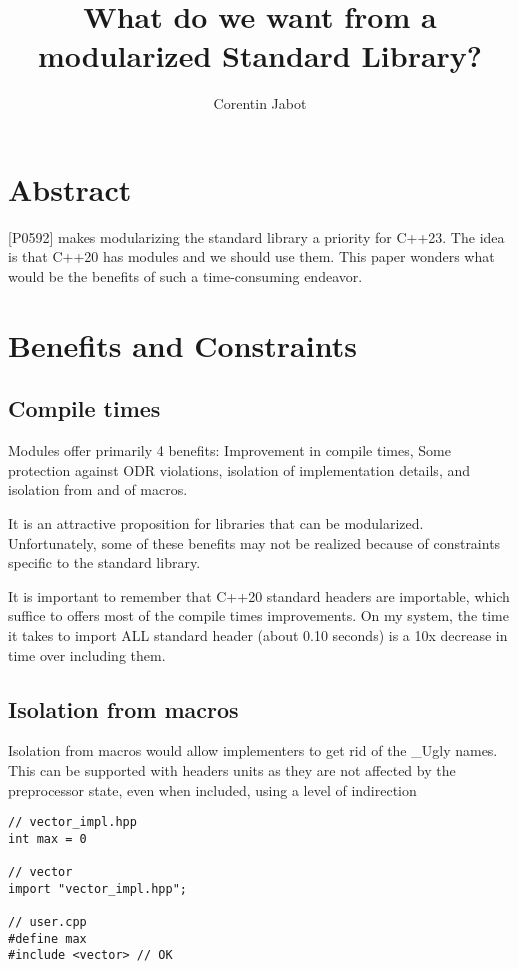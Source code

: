 \documentclass{wg21}
\title{What do we want from a modularized Standard Library?}
\author{Corentin Jabot}{corentin.jabot@gmail.com}
\begin{document}
\maketitle




\section{Abstract}

[P0592]\cite{P0592R4} makes modularizing the standard library a priority for C++23.
The idea is that C++20 has modules and we should use them.
This paper wonders what would be the benefits of such a time-consuming endeavor.

\section{Benefits and Constraints}

\subsection{Compile times}
Modules offer primarily 4 benefits: Improvement in compile times, Some protection against ODR violations, isolation of implementation details, and isolation from and of macros.

It is an attractive proposition for libraries that can be modularized.
Unfortunately, some of these benefits may not be realized because of constraints specific to the standard library.

It is important to remember that C++20 standard headers are importable, which suffice to offers most of the compile times improvements.
On my system, the time it takes to import ALL standard header (about 0.10 seconds) is a 10x decrease in time over including them.

\subsection{Isolation from macros}

Isolation from macros would allow implementers to get rid of the _Ugly names.
This can be supported with headers units as they are not affected by the preprocessor state,
even when included, using a level of indirection

\begin{lstlisting}[style=color]
// vector_impl.hpp
int max = 0

// vector
import "vector_impl.hpp";

// user.cpp
#define max
#include <vector> // OK
\end{lstlisting}
\end{document}
